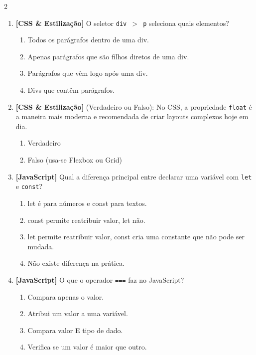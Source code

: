 \documentclass[a4paper,10pt]{article}
\begin{document}
\begin{multicols*}{2}
\begin{enumerate}[label=\textbf{\arabic*.}, resume, leftmargin=*]
\item \textbf{[CSS \& Estilização]} O seletor \texttt{div $>$ p} seleciona quais elementos?
\begin{enumerate}[label=(\alph*), noitemsep]
  \item Todos os parágrafos dentro de uma div.
  \item Apenas parágrafos que são filhos diretos de uma div.
  \item Parágrafos que vêm logo após uma div.
  \item Divs que contêm parágrafos.
\end{enumerate}

\item \textbf{[CSS \& Estilização]} (Verdadeiro ou Falso): No CSS, a propriedade \texttt{float} é a maneira mais moderna e recomendada de criar layouts complexos hoje em dia.
\begin{enumerate}[label=(\alph*), noitemsep]
  \item Verdadeiro
  \item Falso (usa-se Flexbox ou Grid)
\end{enumerate}

\item \textbf{[JavaScript]} Qual a diferença principal entre declarar uma variável com \texttt{let} e \texttt{const}?
\begin{enumerate}[label=(\alph*), noitemsep]
  \item let é para números e const para textos.
  \item const permite reatribuir valor, let não.
  \item let permite reatribuir valor, const cria uma constante que não pode ser mudada.
  \item Não existe diferença na prática.
\end{enumerate}

\item \textbf{[JavaScript]} O que o operador \texttt{===} faz no JavaScript?
\begin{enumerate}[label=(\alph*), noitemsep]
  \item Compara apenas o valor.
  \item Atribui um valor a uma variável.
  \item Compara valor E tipo de dado.
  \item Verifica se um valor é maior que outro.
\end{enumerate}


\end{enumerate}
\end{multicols*}
\end{document}
